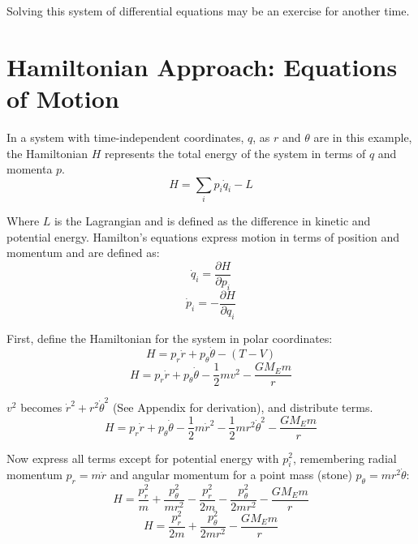 \documentclass[aps,twocolumn]{revtex4-1}
\begin{document}
Solving this system of differential equations may be an exercise for another time\cite{orbitSolution}.

\section{Hamiltonian Approach: Equations of Motion}
In a system with time-independent coordinates, $q$, as $r$ and $\theta$ are in this example, the Hamiltonian $H$ represents the total energy of the system in terms of $q$ and momenta $p$.
\begin{equation}
    H = \sum_{i} p_i\dot q_i - L
\end{equation}

Where $L$ is the Lagrangian and is defined as the difference in kinetic and potential energy. Hamilton's equations express motion in terms of position and momentum and are defined as:
\begin{equation}
    \dot q_i = \frac{\partial H}{\partial p_i} \label{qdot}
\end{equation}
\begin{equation}
    \dot p_i = -\frac{\partial H}{\partial q_i} \label{pdot}
\end{equation}

First, define the Hamiltonian for the system in polar coordinates:
\begin{equation*}
    H=p_r\dot r + p_{\theta}\dot \theta - (T-V)
\end{equation*}
\begin{equation*}
    H =p_r\dot r + p_{\theta}\dot \theta - \frac{1}{2}mv^2 - \frac{GM_Em}{r}
\end{equation*}

$v^2$ becomes $\dot r^2 + r^2 \dot \theta^2$ (See Appendix for derivation), and distribute terms.
\begin{equation}
        H =p_r\dot r + p_{\theta}\dot \theta - \frac{1}{2}m\dot r^2 - \frac{1}{2}m r^2 \dot \theta^2 - \frac{GM_Em}{r}
\end{equation}

Now express all terms except for potential energy with $p_i^2$, remembering radial momentum $p_r=m\dot r$ and angular momentum for a point mass (stone) $p_\theta = mr^2\dot \theta$:
\begin{equation*}
    H = \frac{p_r^2}{m} + \frac{p_\theta^2}{mr^2} - \frac{p_r^2}{2m} - \frac{p_\theta^2}{2mr^2} - \frac{GM_Em}{r}
\end{equation*}
\begin{equation}
    H = \frac{p_r^2}{2m} + \frac{p_\theta^2}{2mr^2} - \frac{GM_Em}{r} \label{energyH}
\end{equation}
\end{document}
